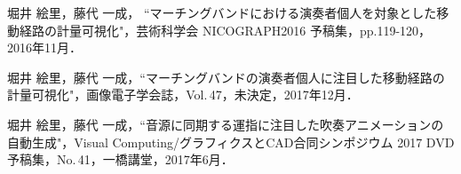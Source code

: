 \renewcommand{\refname}{公開文献}	
%
\begin{thebibliography}{55}
%
堀井 絵里，藤代 一成，
``マーチングバンドにおける演奏者個人を対象とした移動経路の計量可視化"，芸術科学会 NICOGRAPH2016 予稿集，pp.119-120，2016年11月．

堀井 絵里，藤代 一成，``マーチングバンドの演奏者個人に注目した移動経路の計量可視化"，画像電子学会誌，Vol.\,47，未決定，2017年12月．

堀井 絵里，藤代 一成，``音源に同期する運指に注目した吹奏アニメーションの自動生成"，Visual Computing/グラフィクスとCAD合同シンポジウム 2017 DVD 予稿集，No.\,41，一橋講堂，2017年6月．

\end{thebibliography}